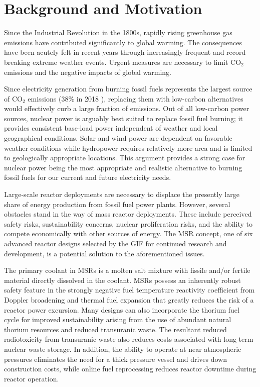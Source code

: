\section{Background and Motivation}

Since the Industrial Revolution in the 1800s, rapidly rising greenhouse gas
emissions have contributed significantly to global warming. The consequences
have been acutely felt in recent years through increasingly frequent
and record breaking extreme weather events. Urgent measures are necessary to
limit CO$_2$ emissions and the negative impacts of global warming.

Since electricity generation from burning fossil fuels represents the
largest source of CO$_2$ emissions (38\% in 2018 \cite{iea_global_2019}),
replacing them with low-carbon
alternatives would effectively curb a large fraction of emissions. Out
of all low-carbon power sources, nuclear power is arguably best suited to
replace fossil fuel burning; it provides consistent base-load
power independent of weather and local geographical conditions. Solar and wind
power are dependent on favorable weather conditions while hydropower requires
relatively more area and is limited to geologically appropriate locations.
This argument provides a strong case for nuclear power being the most
appropriate and realistic alternative to burning fossil fuels for our current
and future electricity needs.

Large-scale reactor deployments are necessary to displace the
presently large share of energy production from fossil fuel power plants.
However, several obstacles stand in the way of mass reactor deployments. These
include perceived safety risks, sustainability concerns, nuclear proliferation
risks, and the ability to compete economically with other sources of energy.
The \gls{MSR} concept, one of six advanced reactor designs
selected by the \gls{GIF} \cite{gif_technology_2002} for continued research
and development, is a potential solution to the aforementioned issues.

The primary coolant in MSRs is a molten salt mixture
with fissile and/or fertile material directly dissolved in the coolant.
MSRs possess an inherently robust safety feature in the
strongly negative fuel temperature reactivity coefficient from Doppler
broadening and thermal fuel expansion that greatly reduces
the risk of a reactor power excursion. Many designs can also incorporate the
thorium fuel cycle for improved sustainability arising from the use of
abundant natural thorium resources and reduced transuranic waste. The
resultant reduced radiotoxicity from transuranic waste also reduces costs
associated with long-term nuclear waste storage. In addition, the ability to
operate at near atmospheric pressures eliminates the need for a thick pressure
vessel and drives down construction costs, while online fuel reprocessing
reduces reactor downtime during reactor operation.

